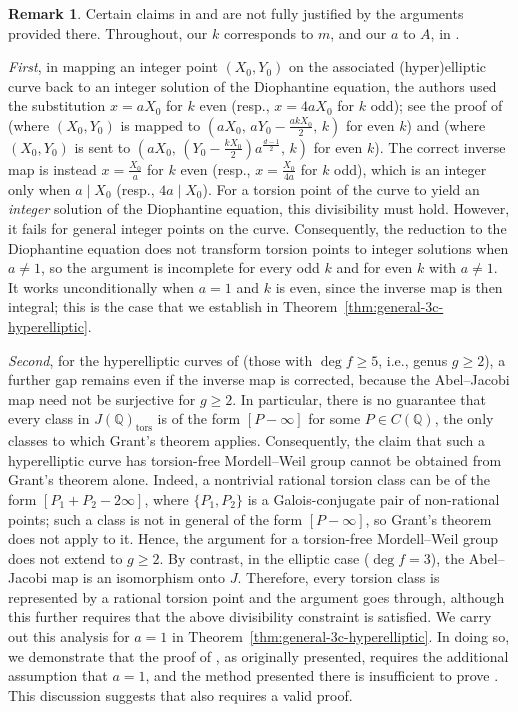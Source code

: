 \documentclass[11pt,a4paper]{amsart}
\newcommand{\Q}{\mathbb{Q}}
\theoremstyle{plain}
\theoremstyle{definition}
\newtheorem{remark}[theorem]{Remark}
\begin{document}
\begin{remark}\label{rem:pc-correction}
Certain claims in \cite{VaishyaSharma} and \cite{PrakashChakraborty} are not fully justified by the arguments provided there. Throughout, our $k$ corresponds to $m$, and our $a$ to $A$, in \cite{VaishyaSharma}.

\textit{First}, in mapping an integer point $(X_0,Y_0)$ on the associated (hyper)elliptic curve back to an integer solution of the Diophantine equation, the authors used the substitution $x = aX_0$ for $k$ even (resp., $x = 4aX_0$ for $k$ odd); see the proof of \cite[Theorem~1.2]{VaishyaSharma} (where $(X_{0},Y_{0})$ is mapped to $(aX_{0},\,aY_{0}-\tfrac{akX_{0}}{2},\,k)$ for even $k$) and \cite[Theorem~3.3]{PrakashChakraborty} (where $(X_{0},Y_{0})$ is sent to $(aX_{0},\,(Y_{0}-\tfrac{kX_{0}}{2})a^{\frac{d-1}{2}},\,k)$ for even $k$). The correct inverse map is instead $x = \tfrac{X_0}{a}$ for $k$ even (resp., $x = \tfrac{X_0}{4a}$ for $k$ odd), which is an integer only when $a \mid X_0$ (resp., $4a \mid X_0$). For a torsion point of the curve to yield an \textit{integer} solution of the Diophantine equation, this divisibility must hold. However, it fails for general integer points on the curve. Consequently, the reduction to the Diophantine equation does not transform torsion points to integer solutions when $a \neq 1$, so the argument is incomplete for every odd $k$ and for even $k$ with $a \neq 1$. It works unconditionally when $a = 1$ and $k$ is even, since the inverse map is then integral; this is the case that we establish in Theorem~\ref{thm:general-3c-hyperelliptic}.

\textit{Second}, for the hyperelliptic curves of \cite{PrakashChakraborty} (those with $\deg f \ge 5$, i.e., genus $g \ge 2$), a further gap remains even if the inverse map is corrected, because the Abel--Jacobi map need not be surjective for $g \ge 2$. In particular, there is no guarantee that every class in $J(\Q)_{\mathrm{tors}}$ is of the form $[P - \infty]$ for some $P \in C(\Q)$, the only classes to which Grant's theorem applies. Consequently, the claim that such a hyperelliptic curve has torsion-free Mordell--Weil group cannot be obtained from Grant's theorem alone. Indeed, a nontrivial rational torsion class can be of the form $[P_1 + P_2 - 2\infty]$, where $\{P_1, P_2\}$ is a Galois-conjugate pair of non-rational points; such a class is not in general of the form $[P - \infty]$, so Grant's theorem does not apply to it. Hence, the argument for a torsion-free Mordell--Weil group does not extend to $g \ge 2$. By contrast, in the elliptic case ($\deg f = 3$), the Abel--Jacobi map is an isomorphism onto $J$. Therefore, every torsion class is represented by a rational torsion point and the argument goes through, although this further requires that the above divisibility constraint is satisfied. We carry out this analysis for $a = 1$ in Theorem~\ref{thm:general-3c-hyperelliptic}. In doing so, we demonstrate that the proof of \cite[Theorem~1.2 (1)]{VaishyaSharma}, as originally presented, requires the additional assumption that $a=1$, and the method presented there is insufficient to prove \cite[Theorem~1.2 (2)]{VaishyaSharma}. This discussion suggests that \cite[Corollary~1.4]{VaishyaSharma} also requires a valid proof.


\end{remark}
\end{document}

